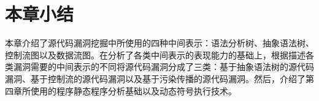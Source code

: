 %
%
%
%




\section{本章小结}

本章介绍了源代码漏洞挖掘中所使用的四种中间表示：语法分析树、抽象语法树、控制流图以及数据流图。在分析了各类中间表示的表现能力的基础上，根据描述各类漏洞需要的中间表示的不同将源代码漏洞分成了三类：基于抽象语法树的源代码漏洞、基于控制流的源代码漏洞以及基于污染传播的源代码漏洞。然后，介绍了第四章所使用的程序静态程序分析基础以及动态符号执行技术。
